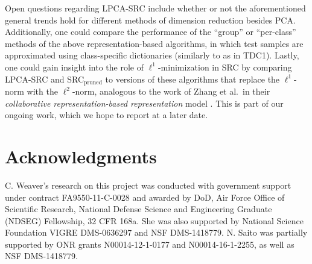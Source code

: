 \documentclass[review]{elsarticle}
\begin{document}
Open questions regarding LPCA-SRC include whether or not the aforementioned general trends hold for different methods of dimension reduction besides PCA. Additionally, one could compare the performance of the ``group'' or ``per-class'' methods of the above representation-based algorithms, in which test samples are approximated using class-specific dictionaries (similarly to as in TDC1). Lastly, one could gain insight into the role of $\ell^1$-minimization in SRC by comparing LPCA-SRC and SRC$_\mathrm{pruned}$ to versions of these algorithms that replace the $\ell^1$-norm with the $\ell^2$-norm, analogous to the work of Zhang et al.\ in their \emph{collaborative representation-based representation} model \cite{zha:crc2}. This is part of our ongoing work, which we hope to report at a later date. 








\section*{Acknowledgments}

C. Weaver's research on this project was conducted with government support under contract FA9550-11-C-0028 and awarded by DoD, Air Force Office of Scientific Research, National Defense Science and Engineering Graduate (NDSEG) Fellowship, 32 CFR 168a. She was also supported by National Science Foundation VIGRE DMS-0636297 and NSF DMS-1418779. N. Saito was partially supported by ONR grants N00014-12-1-0177 and N00014-16-1-2255, as well as NSF DMS-1418779.
  




\end{document}
